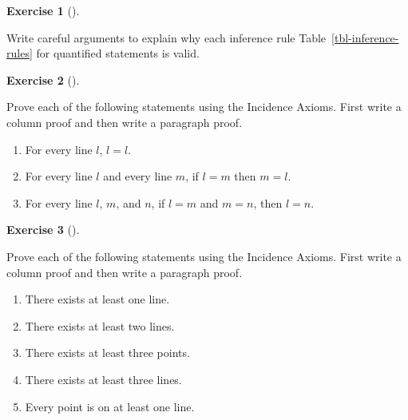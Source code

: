 \documentclass[
  letterpaper,
  10pt,
  reqno,
  twopage,
  openany]{book}
\providecommand{\tightlist}{%
  \setlength{\itemsep}{0pt}\setlength{\parskip}{0pt}}\usepackage{longtable,booktabs,array}
\theoremstyle{plain}
\theoremstyle{definition}
\newtheorem{exercise}{Exercise}[chapter]
\theoremstyle{definition}
\theoremstyle{definition}
\theoremstyle{plain}
\theoremstyle{plain}
\theoremstyle{remark}
\begin{document}
\leavevmode{}%
\begin{exercise}[]\label{exr-quantified-statements}

Write careful arguments to explain why each inference rule
Table~\ref{tbl-inference-rules} for quantified statements is valid.

\end{exercise}

\leavevmode{}%
\begin{exercise}[]\label{exr-geoproofst}

Prove each of the following statements using the Incidence Axioms. First
write a column proof and then write a paragraph proof.

\begin{enumerate}
\def\labelenumi{\arabic{enumi}.}
\tightlist
\item
  For every line \(l\), \(l=l\).
\item
  For every line \(l\) and every line \(m\), if \(l=m\) then \(m=l\).
\item
  For every line \(l\), \(m\), and \(n\), if \(l=m\) and \(m=n\), then
  \(l=n\).
\end{enumerate}

\end{exercise}

\leavevmode{}%
\begin{exercise}[]\label{exr-inaxst}

Prove each of the following statements using the Incidence Axioms. First
write a column proof and then write a paragraph proof.

\begin{enumerate}
\def\labelenumi{\arabic{enumi}.}
\tightlist
\item
  There exists at least one line.
\item
  There exists at least two lines.
\item
  There exists at least three points.
\item
  There exists at least three lines.
\item
  Every point is on at least one line.
\end{enumerate}

\end{exercise}
\end{document}
